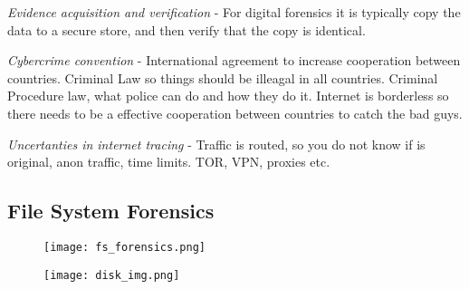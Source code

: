 \textit{Evidence acquisition and verification} - For digital forensics it is typically
copy the data to a secure store, and then verify that the copy is
identical.

\textit{Cybercrime convention} - International agreement to increase cooperation
between countries. Criminal Law so things should be illeagal in all
countries. Criminal Procedure law, what police can do and how they do it.
Internet is borderless so there needs to be a effective cooperation
between countries to catch the bad guys.

\textit{Uncertanties in internet tracing} - Traffic is routed, so you do not
know if is original, anon traffic, time limits. TOR, VPN, proxies etc.

\subsection{File System Forensics}
\begin{figure}[h]
    \centering\texttt{[image: fs\_forensics.png]}
\end{figure}
\begin{figure}[h]
    \centering\texttt{[image: disk\_img.png]}
\end{figure}

